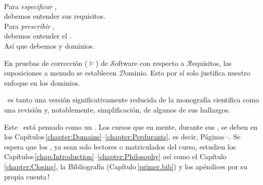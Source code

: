 \label{chap:Introduction}\label{chap:Introduction.1}
\minitoc

\begin{flushright}\label{intro:The Triptych Dogma}
\\[4mm]
\sf Para \textsl{especificar} ,\\
\sf debemos entender sus requisitos.\\[1mm]
\sf Para \textsl{prescribir} ,\\
\sf debemos entender el .\\[1mm]
\sf Así que debemos  y  dominios.\\
\end{flushright}\rm%
\mnewfoil

\noindent
\begynd
\pind En pruebas de corrección ($\models$) %
\begynd
\pind de $\mathcal{S}$oftware
\pind con respecto a $\mathcal{R}$equisitos,
\pind las suposiciones a menudo se establecen  $\mathcal{D}$ominio.
\afslut
\pind Esto por sí solo justifica nuestro enfoque en los dominios.
\afslut
\endboiteepaisseavecuntitre

\mnewfoil

\noindent
\begynd
\pind {} \manual\ es
\begynd
\pind tanto una versión significativamente reducida \nyl de la monografía científica \cite{BjornerMonograph2020} 
\pind como una revisión y, notablemente, simplificación, de algunos de sus hallazgos.
\afslut
\afslut

\label{sec:Why This Primer}

\begynd
\pind Este \manual\ está pensado como un .
\pind Los cursos que  en mente, durante sus , se deben  en los
      Capítulos\,\ref{chapter:Domains}--\ref{chapter:Perdurants},
      es decir, Páginas\,\pageref{chapter:Domains}--\pageref{chapter:Perdurants.n}.
\pind Se espera que los , ya sean solo lectores o matriculados del curso, estudien
      los Capítulos\,\ref{chap:Introduction}--\ref{chapter:Philosophy} así
      como el Capítulo\,\ref{chapter:Closing}, la Bibliografía
      (Capítulo\,\ref{primer.bib}) y los apéndices por su propia cuenta\,!
\afslut

